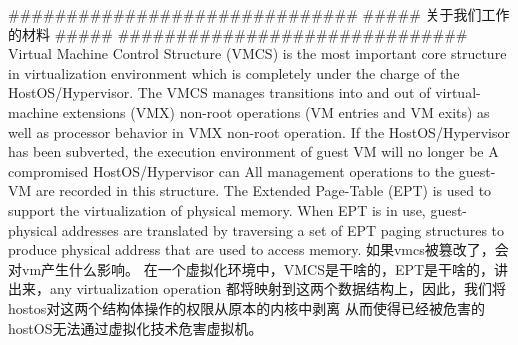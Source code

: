 \iffalse
HyperPS is comp

Our isolated execution does not rely on a special hardware feature, nor demand a higher privilege level. Our isolated execution actually shares the same privilege level with the HostOS kernel. 


, especially the isolated
So that the security of virtual machines can be strongly protected, even if the HostOS/hypervisor has been compromised

HyperPS guarantees the virtual machine's runtime security 
based on privilege separation. 
HyperPS does not relying on any special hardware or reconstructs current commercial cloud architecture. The key idea of HyperPS is to separate the core virtualization privileges possessed by the HostOS/Hypervisor, especially the privileges of managing the physical memory, into an isolated execution environment alongside the HostOS kernel. 

So that the security of virtual machines can be strongly protected, even if the HostOS/hypervisor has been compromised. Our isolated execution does not rely on a special hardware feature, nor demand a higher privilege level. Our isolated execution actually shares the same privilege level with the HostOS kernel. 
\fi



\iffalse
##############################
##### 关于我们工作的材料 #####
##############################
Virtual Machine Control Structure (VMCS) is the most important core structure in virtualization environment which is completely under the charge of the HostOS/Hypervisor. The VMCS manages transitions into and out of virtual-machine extensions (VMX) non-root operations (VM entries and VM exits) as well as processor behavior in VMX non-root operation. If the HostOS/Hypervisor has been subverted, the execution environment of guest VM will no longer be 
A compromised HostOS/Hypervisor can 
All management operations to the guest-VM are recorded in this structure.
The Extended Page-Table (EPT) is used to support the virtualization of physical memory. When EPT is in use, guest-physical addresses are translated by traversing a set of EPT paging structures to produce physical address that are used to access memory.
如果vmcs被篡改了，会对vm产生什么影响。
在一个虚拟化环境中，VMCS是干啥的，EPT是干啥的，讲出来，any virtualization operation 都将映射到这两个数据结构上，因此，我们将hostos对这两个结构体操作的权限从原本的内核中剥离
从而使得已经被危害的hostOS无法通过虚拟化技术危害虚拟机。

